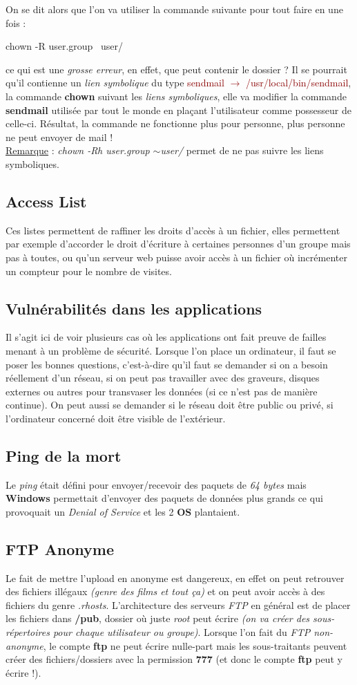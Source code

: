\documentclass{article}
\newcommand{\titre}[1]{\textcolor{title}{#1}}
\newcommand{\tsect}[1]{\titre{\section{#1}}}
\newcommand{\tssect}[1]{\titre{\subsection{#1}}}
\newcommand{\red}[1]{\textcolor{darkred}{#1}}
\newcommand{\term}[1]{\textit{\textcolor{maintitle}{#1}}}
\begin{document}
\begin{sffamily}
On se dit alors que l'on va utiliser la commande suivante pour tout faire en une fois : 
\begin{center}
	\begin{boxedverbatim}
	chown -R user.group ~user/
	\end{boxedverbatim}
\end{center}

ce qui est une \term{grosse erreur}, en effet, que peut contenir le dossier ? Il se pourrait qu'il contienne un 
\term{lien symbolique} du type \red{sendmail $\rightarrow$ /usr/local/bin/sendmail}, la commande \textbf{chown} suivant
les \term{liens symboliques}, elle va modifier la commande \textbf{sendmail} utilisée par tout le monde en plaçant 
l'utilisateur comme possesseur de celle-ci. Résultat, la commande ne fonctionne plus pour personne, plus personne ne 
peut envoyer de mail ! \\

\noindent\underline{Remarque} : \textit{chown -Rh user.group $\sim$user/} permet de ne pas suivre les liens 
symboliques.

\tssect{Access List}

Ces listes permettent de raffiner les droits d'accès à un fichier, elles permettent par exemple d'accorder le droit 
d'écriture à certaines personnes d'un groupe mais pas à toutes, ou qu'un serveur web puisse avoir accès à un fichier où
incrémenter un compteur pour le nombre de visites.

\tsect{Vulnérabilités dans les applications}

Il s'agit ici de voir plusieurs cas où les applications ont fait preuve de failles menant à un problème de sécurité. 
Lorsque l'on place un ordinateur, il faut se poser les bonnes questions, c'est-à-dire qu'il faut se demander si on a 
besoin réellement d'un réseau, si on peut pas travailler avec des graveurs, disques externes ou autres pour transvaser 
les données (si ce n'est pas de manière continue). On peut aussi se demander si le réseau doit être public ou privé, si 
l'ordinateur concerné doit être visible de l'extérieur.

\tssect{Ping de la mort}

Le \term{ping} était défini pour envoyer/recevoir des paquets de \term{64 bytes} mais \textbf{Windows} permettait 
d'envoyer des paquets de données plus grands ce qui provoquait un \term{Denial of Service} et les 2 \textbf{OS} 
plantaient.

\newpage
\tssect{FTP Anonyme}

Le fait de mettre l'upload en anonyme est dangereux, en effet on peut retrouver des fichiers illégaux \textit{(genre 
des films et tout ça)} et on peut avoir accès à des fichiers du genre \textit{.rhosts}. L'architecture des serveurs 
\term{FTP} en général est de placer les fichiers dans \textbf{/pub}, dossier où juste \term{root} peut écrire 
\textit{(on va créer des sous-répertoires pour chaque utilisateur ou groupe)}. Lorsque l'on fait du \term{FTP non-
anonyme}, le compte \textbf{ftp} ne peut écrire nulle-part mais les sous-traitants peuvent créer des fichiers/dossiers 
avec la permission \textbf{777} (et donc le compte \textbf{ftp} peut y écrire !). \\


\end{sffamily}
\end{document}
